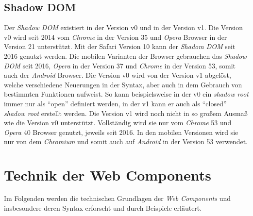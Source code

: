 \documentclass[12pt, paper=a4, bibtotoc, toc=listof, headsepline=true]{scrreprt}
\begin{document}
		\subsection{Shadow DOM}
		Der \emph{Shadow \ac{DOM}} existiert in der Version v0 und in der Version v1. Die Version v0 wird seit 2014 vom \emph{Chrome} in der Version 35 und \emph{Opera} Browser in der Version 21 unterstützt. Mit der Safari Version 10 kann der \emph{Shadom \ac{DOM}} seit 2016  genutzt werden\cite{NiwaShaDom}. Die mobilen Varianten der Browser gebrauchen das \emph{Shadow \ac{DOM}} seit 2016, \emph{Opera} in der Version 37 und \emph{Chrome} in der Version 53, somit auch der \emph{Android} Browser\cite{Hayato2016}. Die Version v0 wird von der Version v1 abgelöst, welche verschiedene Neuerungen in der Syntax, aber auch in dem Gebrauch von bestimmten Funktionen aufweist. So kann beispielsweise in der v0 ein \emph{shadow root} immer nur als \enquote{open} definiert werden, in der v1 kann er auch als \enquote{closed} \emph{shadow root} erstellt werden\cite{Ito2016}.
		Die Version v1 wird noch nicht in so großem Ausmaß wie die Version v0 unterstützt. Vollständig wird sie nur vom \emph{Chrome} 53 und \emph{Opera} 40 Browser genutzt, jeweils seit 2016. In den mobilen Versionen wird sie nur von dem \emph{Chromium} und somit auch auf \emph{Android} in der Version 53 verwendet\cite{Hayato2016a}.
	
			
	\section{Technik der Web Components}
	Im Folgenden werden die technischen Grundlagen der \emph{Web Components} und insbesondere deren Syntax erforscht und durch Beispiele erläutert.
\end{document}
